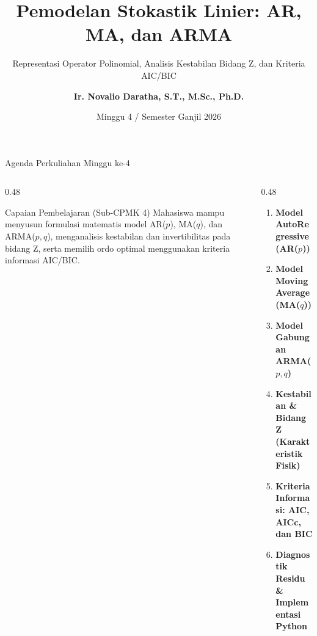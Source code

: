\documentclass[aspectratio=169, 10pt]{beamer}
\title[\textbf{Deret Waktu (Minggu 4)}]{\textbf{Pemodelan Stokastik Linier: AR, MA, dan ARMA}}
\subtitle{Representasi Operator Polinomial, Analisis Kestabilan Bidang Z, dan Kriteria AIC/BIC}
\author[\textbf{Ir. Novalio Daratha, Ph.D.}]{\textbf{Ir. Novalio Daratha, S.T., M.Sc., Ph.D.}}
\institute[FT UNIB]{Program Studi Teknik Elektro -- Fakultas Teknik\\Universitas Bengkulu}
\date{Minggu 4 / Semester Ganjil 2026}
\begin{document}
\begin{frame}[plain]
    \titlepage
\end{frame}

\begin{frame}{Agenda Perkuliahan Minggu ke-4}
    \begin{columns}[T]
        \begin{column}{0.48\textwidth}
            \begin{block}{Capaian Pembelajaran (Sub-CPMK 4)}
                Mahasiswa mampu menyusun formulasi matematis model AR($p$), MA($q$), dan ARMA($p,q$), menganalisis kestabilan dan invertibilitas pada bidang Z, serta memilih ordo optimal menggunakan kriteria informasi AIC/BIC.
            \end{block}
        \end{column}
        \begin{column}{0.48\textwidth}
            \begin{enumerate}
                \item \textbf{Model AutoRegressive (AR($p$))}
                \item \textbf{Model Moving Average (MA($q$))}
                \item \textbf{Model Gabungan ARMA($p,q$)}
                \item \textbf{Kestabilan \& Bidang Z (Karakteristik Fisik)}
                \item \textbf{Kriteria Informasi: AIC, AICc, dan BIC}
                \item \textbf{Diagnostik Residu \& Implementasi Python}
            \end{enumerate}
        \end{column}
    \end{columns}
\end{frame}
\end{document}
